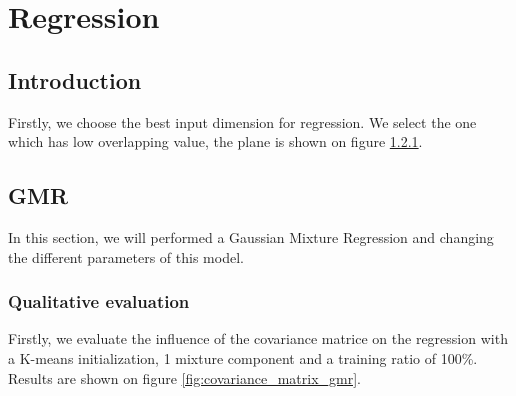 \section{Regression}
\label{regression}

\subsection{Introduction}
Firstly, we choose the best input dimension for regression. We select the one which has low overlapping value, the plane is shown on figure \ref{}.

\subsection{GMR} 



In this section, we will performed a Gaussian Mixture Regression and changing the different parameters of this model. 
\subsubsection{Qualitative evaluation}
Firstly, we evaluate the influence of the covariance matrice on the regression with a K-means initialization, 1 mixture component and a training ratio of 100\%. Results are shown on figure \ref{fig:covariance_matrix_gmr}.

